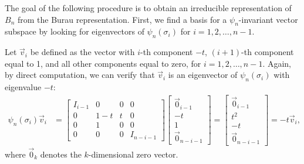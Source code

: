 
The goal of the following procedure is to obtain an irreducible representation of $B_n$ from the Burau representation. First, we find a basis for a $\psi_n$-invariant vector subspace by looking for eigenvectors of $\psi_n(\sigma_i)$ for $i=1,2,\dots,n-1$.

Let $\vec{v}_i$ be defined as the vector with $i$-th component $-t$, $(i+1)$-th component equal to 1, and all other components equal to zero, for $i=1,2,\dots,n-1$. Again, by direct computation, we can verify that $\vec{v}_i$ is an eigenvector of $\psi_n(\sigma_i)$ with eigenvalue $-t$:
\begin{align}
    \psi_n(\sigma_i)\vec{v}_i &= \begin{bmatrix}
        I_{i-1} & 0 & 0 & 0 \\
        0 & 1-t & t & 0 \\
        0 & 1 & 0 & 0 \\
        0 & 0 & 0 & I_{n-i-1}
    \end{bmatrix}\begin{bmatrix}
        \vec{0}_{i-1} \\ -t \\ 1 \\ \vec{0}_{n-i-1}
    \end{bmatrix} = \begin{bmatrix}
        \vec{0}_{i-1} \\ t^2 \\ -t \\ \vec{0}_{n-i-1}
    \end{bmatrix} = -t\vec{v}_i,
\end{align}
where $\vec{0}_{k}$ denotes the $k$-dimensional zero vector.


